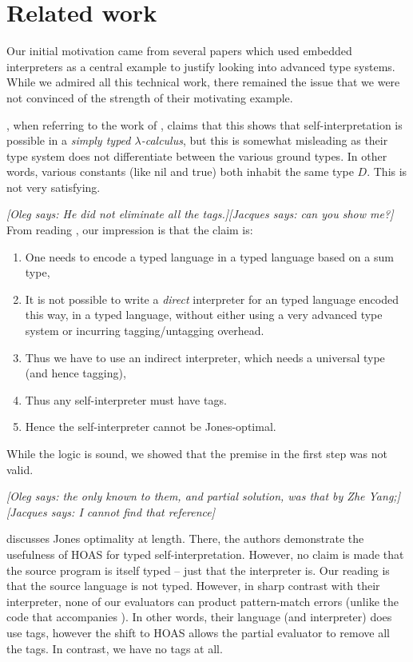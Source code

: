\documentclass[preprint]{sigplanconf}
\newcommand{\jacques}[1]{{\it [Jacques says: #1]}}
\newcommand{\oleg}[1]{{\it [Oleg says: #1]}}
\begin{document}
\section{Related work}\label{related}

Our initial motivation came from several papers 
\citet{WalidICFP02,taha-tag,xi-guarded,peyton-jones-simple} which used
embedded interpreters as a central example to justify looking 
into advanced type systems.  While we admired all this technical work,
there remained the issue that we were not convinced of the strength
of their motivating example.

\citet{WalidICFP02}, when referring to the work of \citet{taha-tag},
claims that this shows that self-interpretation is possible in a
\emph{simply typed $\lambda$-calculus}, but this is somewhat misleading
as their type system does not differentiate between the various ground
types.  In other words, various constants (like \textsf{nil} and 
\textsf{true}) both inhabit the same type $D$.  This is not very satisfying.

\oleg{He did not eliminate all the tags.}\jacques{can you show me?}
From reading \citet{WalidICFP02,taha-tag,xi-guarded,peyton-jones-simple}, our 
impression is that the claim is:
\begin{enumerate}
\item One needs to encode a typed language in a typed language based on
a sum type,
\item It is not possible to write a \emph{direct} interpreter for an typed
language encoded this way, in a typed language, without either using a
very advanced type system or incurring tagging/untagging overhead.
\item Thus we have to use an indirect interpreter, which needs a universal
  type (and hence tagging),
\item Thus any self-interpreter must have tags.
\item Hence the self-interpreter cannot be Jones-optimal.
\end{enumerate}
While the logic is sound, we showed that the premise in the first step
was not valid.

\oleg{the only known to them, and \emph{partial} solution, was 
  that by Zhe Yang;}\jacques{I cannot find that reference}

\citet{Danvy-tagging-encoding} discusses Jones optimality at length.
There, the authors demonstrate the usefulness of HOAS for typed
self-interpretation.  However, no claim is made that the source program
is itself typed -- just that the interpreter is.  Our reading is that
the source language is not typed.  However, in sharp contrast with 
their interpreter, none of our evaluators can product pattern-match errors
(unlike the code that accompanies \citet{Danvy-tagging-encoding}).
In other words, their language (and interpreter) does use tags, however
the shift to HOAS allows the partial evaluator to remove all the tags.
In contrast, we have no tags at all.
\end{document}
